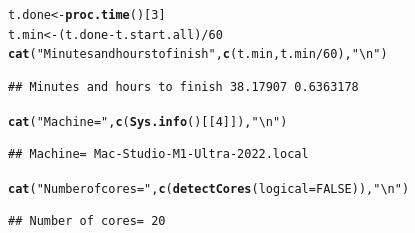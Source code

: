 \documentclass[9pt]{article}\usepackage[]{graphicx}\usepackage[]{xcolor}
\makeatletter
\newcommand{\hlnum}[1]{\textcolor[rgb]{0.686,0.059,0.569}{#1}}%
\newcommand{\hlstr}[1]{\textcolor[rgb]{0.192,0.494,0.8}{#1}}%
\newcommand{\hlopt}[1]{\textcolor[rgb]{0,0,0}{#1}}%
\newcommand{\hlstd}[1]{\textcolor[rgb]{0.345,0.345,0.345}{#1}}%
\newcommand{\hlkwb}[1]{\textcolor[rgb]{0.69,0.353,0.396}{#1}}%
\newcommand{\hlkwc}[1]{\textcolor[rgb]{0.333,0.667,0.333}{#1}}%
\newcommand{\hlkwd}[1]{\textcolor[rgb]{0.737,0.353,0.396}{\textbf{#1}}}%
\newenvironment{kframe}{%
 \def\at@end@of@kframe{}%
 \ifinner\ifhmode%
  \def\at@end@of@kframe{\end{minipage}}%
  \begin{minipage}{\columnwidth}%
 \fi\fi%
 \def\FrameCommand##1{\hskip\@totalleftmargin \hskip-\fboxsep
 \colorbox{shadecolor}{##1}\hskip-\fboxsep
     \hskip-\linewidth \hskip-\@totalleftmargin \hskip\columnwidth}%
 \MakeFramed {\advance\hsize-\width
   \@totalleftmargin\z@ \linewidth\hsize
   \@setminipage}}%
 {\par\unskip\endMakeFramed%
 \at@end@of@kframe}
\newenvironment{knitrout}{}{} %
\theoremstyle{definition}
\theoremstyle{remark}
\makeatother
\begin{document}
\begin{knitrout}
\color{fgcolor}\begin{kframe}
\begin{alltt}
\hlstd{t.done} \hlkwb{<-} \hlkwd{proc.time}\hlstd{()[}\hlnum{3}\hlstd{]}
\hlstd{t.min} \hlkwb{<-} \hlstd{(t.done} \hlopt{-} \hlstd{t.start.all)}\hlopt{/}\hlnum{60}
\hlkwd{cat}\hlstd{(}\hlstr{"Minutes and hours to finish"}\hlstd{,} \hlkwd{c}\hlstd{(t.min, t.min}\hlopt{/}\hlnum{60}\hlstd{),} \hlstr{"\textbackslash{}n"}\hlstd{)}
\end{alltt}
\begin{verbatim}
## Minutes and hours to finish 38.17907 0.6363178
\end{verbatim}
\begin{alltt}
\hlkwd{cat}\hlstd{(}\hlstr{"Machine="}\hlstd{,} \hlkwd{c}\hlstd{(}\hlkwd{Sys.info}\hlstd{()[[}\hlnum{4}\hlstd{]]),} \hlstr{"\textbackslash{}n"}\hlstd{)}
\end{alltt}
\begin{verbatim}
## Machine= Mac-Studio-M1-Ultra-2022.local
\end{verbatim}
\begin{alltt}
\hlkwd{cat}\hlstd{(}\hlstr{"Number of cores="}\hlstd{,} \hlkwd{c}\hlstd{(}\hlkwd{detectCores}\hlstd{(}\hlkwc{logical} \hlstd{=} \hlnum{FALSE}\hlstd{)),} \hlstr{"\textbackslash{}n"}\hlstd{)}
\end{alltt}
\begin{verbatim}
## Number of cores= 20
\end{verbatim}
\end{kframe}
\end{knitrout}
\end{document}
